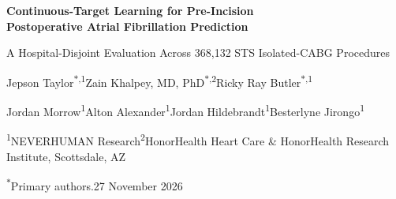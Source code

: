 \documentclass[10pt,letterpaper,twocolumn]{article}
\begin{document}
\onecolumn
\thispagestyle{front}
\vspace*{-0.42in}
\begin{center}
{\bfseries\fontsize{17.8}{21.2}\selectfont\color{ink}Continuous-Target Learning for Pre-Incision\\ Postoperative Atrial Fibrillation Prediction\par}
\vspace{4.5pt}
{\fontsize{12.0}{14.6}\selectfont\color{sub}A Hospital-Disjoint Evaluation Across 368,132 STS Isolated-CABG Procedures\par}
\vspace{10pt}
{\fontsize{10.4}{13.6}\selectfont\color{ink}Jepson Taylor\textsuperscript{$\ast$,1}\hspace{1.8em}Zain Khalpey, MD, PhD\textsuperscript{$\ast$,2}\hspace{1.8em}Ricky Ray Butler\textsuperscript{$\ast$,1}\par
Jordan Morrow\textsuperscript{1}\hspace{1.5em}Alton Alexander\textsuperscript{1}\hspace{1.5em}Jordan Hildebrandt\textsuperscript{1}\hspace{1.5em}Besterlyne Jirongo\textsuperscript{1}\par}
\vspace{3.5pt}
{\fontsize{9.2}{11.4}\selectfont\color{ink}\textsuperscript{1}NEVERHUMAN Research\hspace{1.6em}\textsuperscript{2}HonorHealth Heart Care \& HonorHealth Research Institute, Scottsdale, AZ\par}
\vspace{2.5pt}
{\fontsize{8.4}{10.8}\selectfont\color{sub}\textsuperscript{$\ast$}Primary authors.\hspace{1.2em}27 November 2026\par}
\end{center}
\vspace{5pt}


\end{document}
